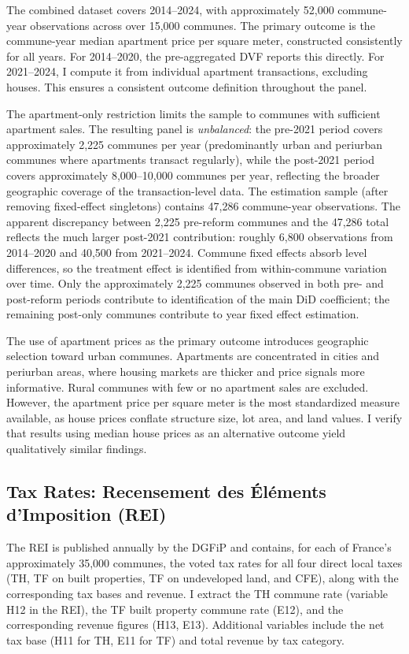 \documentclass[12pt]{article}
\begin{document}
The combined dataset covers 2014--2024, with approximately 52,000 commune-year observations across over 15,000 communes. The primary outcome is the commune-year median apartment price per square meter, constructed consistently for all years. For 2014--2020, the pre-aggregated DVF reports this directly. For 2021--2024, I compute it from individual apartment transactions, excluding houses. This ensures a consistent outcome definition throughout the panel.

The apartment-only restriction limits the sample to communes with sufficient apartment sales. The resulting panel is \emph{unbalanced}: the pre-2021 period covers approximately 2,225 communes per year (predominantly urban and periurban communes where apartments transact regularly), while the post-2021 period covers approximately 8,000--10,000 communes per year, reflecting the broader geographic coverage of the transaction-level data. The estimation sample (after removing fixed-effect singletons) contains 47,286 commune-year observations. The apparent discrepancy between 2,225 pre-reform communes and the 47,286 total reflects the much larger post-2021 contribution: roughly 6,800 observations from 2014--2020 and 40,500 from 2021--2024. Commune fixed effects absorb level differences, so the treatment effect is identified from within-commune variation over time. Only the approximately 2,225 communes observed in both pre- and post-reform periods contribute to identification of the main DiD coefficient; the remaining post-only communes contribute to year fixed effect estimation.

The use of apartment prices as the primary outcome introduces geographic selection toward urban communes. Apartments are concentrated in cities and periurban areas, where housing markets are thicker and price signals more informative. Rural communes with few or no apartment sales are excluded. However, the apartment price per square meter is the most standardized measure available, as house prices conflate structure size, lot area, and land values. I verify that results using median house prices as an alternative outcome yield qualitatively similar findings.

\subsection{Tax Rates: Recensement des \'El\'ements d'Imposition (REI)}

The REI is published annually by the DGFiP and contains, for each of France's approximately 35,000 communes, the voted tax rates for all four direct local taxes (TH, TF on built properties, TF on undeveloped land, and CFE), along with the corresponding tax bases and revenue. I extract the TH commune rate (variable H12 in the REI), the TF built property commune rate (E12), and the corresponding revenue figures (H13, E13). Additional variables include the net tax base (H11 for TH, E11 for TF) and total revenue by tax category.
\end{document}
